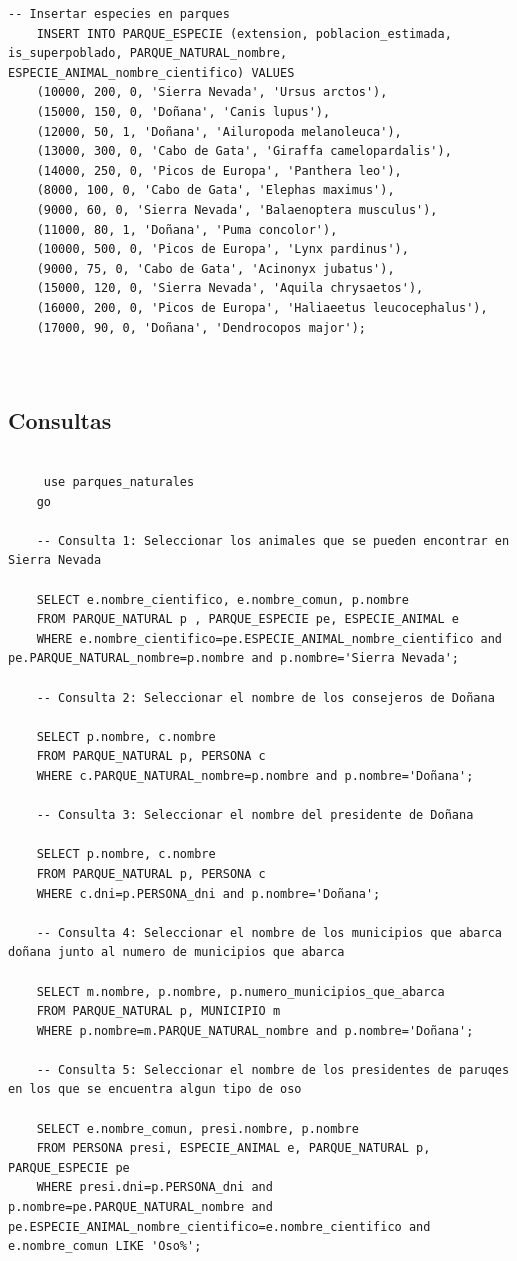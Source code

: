 \documentclass{article}
\begin{document}
\begin{lstlisting}[style=sqlstyle, label=fig:p_insert,caption=Carga de datos]
	-- Insertar especies en parques
	INSERT INTO PARQUE_ESPECIE (extension, poblacion_estimada, is_superpoblado, PARQUE_NATURAL_nombre, ESPECIE_ANIMAL_nombre_cientifico) VALUES
	(10000, 200, 0, 'Sierra Nevada', 'Ursus arctos'),
	(15000, 150, 0, 'Doñana', 'Canis lupus'),
	(12000, 50, 1, 'Doñana', 'Ailuropoda melanoleuca'),
	(13000, 300, 0, 'Cabo de Gata', 'Giraffa camelopardalis'),
	(14000, 250, 0, 'Picos de Europa', 'Panthera leo'),
	(8000, 100, 0, 'Cabo de Gata', 'Elephas maximus'),
	(9000, 60, 0, 'Sierra Nevada', 'Balaenoptera musculus'),
	(11000, 80, 1, 'Doñana', 'Puma concolor'),
	(10000, 500, 0, 'Picos de Europa', 'Lynx pardinus'),
	(9000, 75, 0, 'Cabo de Gata', 'Acinonyx jubatus'),
	(15000, 120, 0, 'Sierra Nevada', 'Aquila chrysaetos'),
	(16000, 200, 0, 'Picos de Europa', 'Haliaeetus leucocephalus'),
	(17000, 90, 0, 'Doñana', 'Dendrocopos major');
	
	
\end{lstlisting}
\subsection{Consultas}

\begin{lstlisting}[style=sqlstyle, label=fig:p_consultas,caption=Consultas Sobre Parques Naturales]
	
	 use parques_naturales
	go
	
	-- Consulta 1: Seleccionar los animales que se pueden encontrar en Sierra Nevada
	
	SELECT e.nombre_cientifico, e.nombre_comun, p.nombre
	FROM PARQUE_NATURAL p , PARQUE_ESPECIE pe, ESPECIE_ANIMAL e
	WHERE e.nombre_cientifico=pe.ESPECIE_ANIMAL_nombre_cientifico and pe.PARQUE_NATURAL_nombre=p.nombre and p.nombre='Sierra Nevada';
	
	-- Consulta 2: Seleccionar el nombre de los consejeros de Doñana
	
	SELECT p.nombre, c.nombre
	FROM PARQUE_NATURAL p, PERSONA c
	WHERE c.PARQUE_NATURAL_nombre=p.nombre and p.nombre='Doñana';
	
	-- Consulta 3: Seleccionar el nombre del presidente de Doñana
	
	SELECT p.nombre, c.nombre
	FROM PARQUE_NATURAL p, PERSONA c
	WHERE c.dni=p.PERSONA_dni and p.nombre='Doñana';
	
	-- Consulta 4: Seleccionar el nombre de los municipios que abarca doñana junto al numero de municipios que abarca
	
	SELECT m.nombre, p.nombre, p.numero_municipios_que_abarca
	FROM PARQUE_NATURAL p, MUNICIPIO m
	WHERE p.nombre=m.PARQUE_NATURAL_nombre and p.nombre='Doñana';
	
	-- Consulta 5: Seleccionar el nombre de los presidentes de paruqes en los que se encuentra algun tipo de oso
	
	SELECT e.nombre_comun, presi.nombre, p.nombre
	FROM PERSONA presi, ESPECIE_ANIMAL e, PARQUE_NATURAL p, PARQUE_ESPECIE pe
	WHERE presi.dni=p.PERSONA_dni and p.nombre=pe.PARQUE_NATURAL_nombre and pe.ESPECIE_ANIMAL_nombre_cientifico=e.nombre_cientifico and e.nombre_comun LIKE 'Oso%';
  \end{lstlisting}
\end{document}
